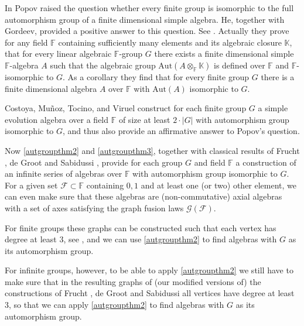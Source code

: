 \documentclass[oneside,a4paper]{amsart} %
\theoremstyle{definition}
\begin{document}
In \cite{popov} Popov raised the question  whether every finite group is isomorphic to  the full automorphism group of a finite dimensional simple algebra. He, together with Gordeev, provided a positive answer to this question. See \cite{gordeev}.
Actually they prove for any field $\mathbb{F}$ containing sufficiently many elements and its algebraic closure $\mathbb{K}$, that 
for every
linear algebraic $\mathbb{F}$-group $G$ there exists a finite dimensional simple $\mathbb{F}$-algebra $A$ such that the algebraic group $\mathrm{Aut}(A\otimes_\mathbb{F} \mathbb{K})$ is defined over $\mathbb{F}$ and $\mathbb{F}$-isomorphic to $G$.
As a corollary they find that for every finite group $G$ there is a finite dimensional algebra $A$ over $\mathbb{F}$ with $\mathrm{Aut}(A)$ isomorphic to $G$.

Costoya, Mu\~{n}oz, Tocino, and Viruel \cite{evolution} construct for each finite group $G$ a simple evolution algebra over a field $\mathbb{F}$
of size at least $2\cdot|G|$ with automorphism group isomorphic to $G$, and thus also provide an affirmative answer to
Popov's question. 

Now \cref{autgroupthm2} and \cref{autgroupthm3}, 
together with  classical results of   Frucht \cite{frucht39,frucht49}, de Groot \cite{groot} and Sabidussi \cite{sabidussi}, 
provide for each group $G$ and  field $\mathbb{F}$ a construction of an infinite series of  algebras over $\mathbb{F}$ with automorphism group isomorphic to $G$.
For a given set $\mathcal{F}\subset \mathbb{F}$ containing $0,1$ and at least one (or two) other element, we can even make sure that these  algebras are (non-commutative) axial algebras with a set of axes satisfying  the graph fusion laws $\mathcal{G}(\mathcal{F})$.



For finite groups these graphs can be constructed such that each vertex has degree at least $3$, see \cite{sabidussi},
and we can use \cref{autgroupthm2} to find algebras with $G$ as its automorphism group.

For infinite groups, however, to be able to apply \cref{autgroupthm2} we still have to make sure that in the resulting graphs of 
(our modified versions of) the constructions of Frucht \cite{frucht39,frucht49}, de Groot \cite{groot} and Sabidussi \cite{sabidussi, sabidussi2} all vertices have degree at least $3$, so that we can apply \cref{autgroupthm2} to find algebras with $G$ as its automorphism group.
\end{document}
